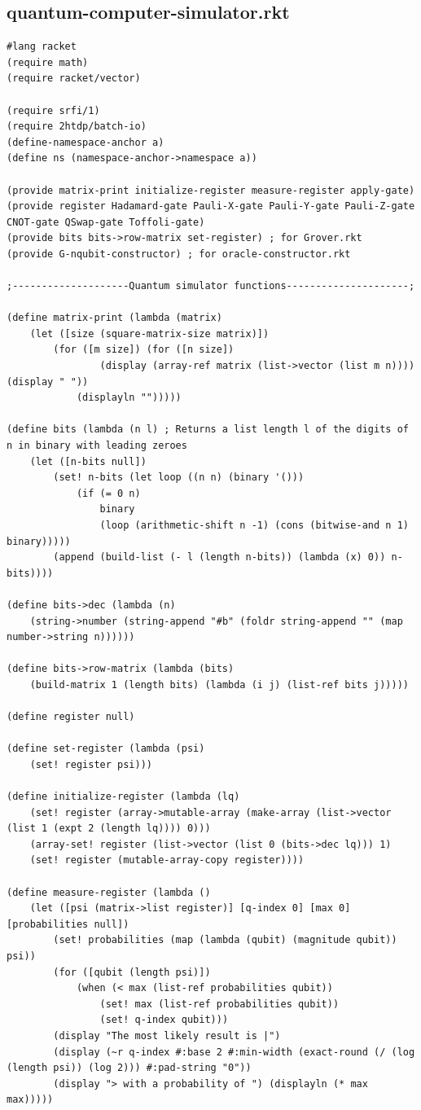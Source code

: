 \documentclass[11pt]{report}
\newcommand{\?}{\stackrel{?}{=}}
\begin{document}
\begin{appendix}
	\chapter{quantum-computer-simulator.rkt}
	\begin{verbatim}
#lang racket
(require math)
(require racket/vector)

(require srfi/1)
(require 2htdp/batch-io)
(define-namespace-anchor a)
(define ns (namespace-anchor->namespace a))

(provide matrix-print initialize-register measure-register apply-gate)
(provide register Hadamard-gate Pauli-X-gate Pauli-Y-gate Pauli-Z-gate CNOT-gate QSwap-gate Toffoli-gate)
(provide bits bits->row-matrix set-register) ; for Grover.rkt
(provide G-nqubit-constructor) ; for oracle-constructor.rkt

;--------------------Quantum simulator functions---------------------;

(define matrix-print (lambda (matrix)
	(let ([size (square-matrix-size matrix)])
		(for ([m size]) (for ([n size])
				(display (array-ref matrix (list->vector (list m n)))) (display " "))
			(displayln "")))))

(define bits (lambda (n l) ; Returns a list length l of the digits of n in binary with leading zeroes
	(let ([n-bits null])
		(set! n-bits (let loop ((n n) (binary '()))
			(if (= 0 n) 
				binary
				(loop (arithmetic-shift n -1) (cons (bitwise-and n 1) binary)))))
		(append (build-list (- l (length n-bits)) (lambda (x) 0)) n-bits))))

(define bits->dec (lambda (n)
	(string->number (string-append "#b" (foldr string-append "" (map number->string n))))))

(define bits->row-matrix (lambda (bits)
	(build-matrix 1 (length bits) (lambda (i j) (list-ref bits j)))))

(define register null)

(define set-register (lambda (psi)
	(set! register psi)))

(define initialize-register (lambda (lq)
	(set! register (array->mutable-array (make-array (list->vector (list 1 (expt 2 (length lq)))) 0)))
	(array-set! register (list->vector (list 0 (bits->dec lq))) 1)
	(set! register (mutable-array-copy register))))

(define measure-register (lambda ()
	(let ([psi (matrix->list register)] [q-index 0] [max 0] [probabilities null])
		(set! probabilities (map (lambda (qubit) (magnitude qubit)) psi))
		(for ([qubit (length psi)])
			(when (< max (list-ref probabilities qubit))
				(set! max (list-ref probabilities qubit))
				(set! q-index qubit)))
		(display "The most likely result is |") 
		(display (~r q-index #:base 2 #:min-width (exact-round (/ (log (length psi)) (log 2))) #:pad-string "0"))
		(display "> with a probability of ") (displayln (* max max)))))


\end{verbatim}
\end{appendix}
\end{document}
